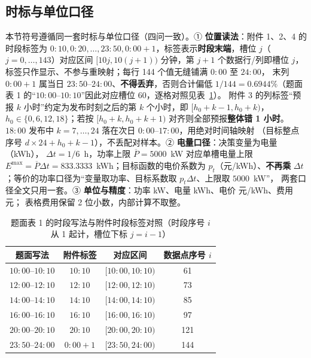 \subsection{时标与单位口径}\label{sec:data-ruler}

本节符号遵循同一套时标与单位口径（四问一致）。① \textbf{位置读法}：附件 1、2、4 的时段标签为 \(0{:}10,0{:}20,\dots,23{:}50,0{:}00{+}1\)，标签表示\textbf{时段末端}，槽位 \(j\)（\(j=0,\dots,143\)）对应区间 \([10j,10(j+1))\) 分钟，第 \(j+1\)
个数据行/列即槽位 \(j\)，标签只作显示、不参与重映射；每行 144 个值无缝铺满 \(0{:}00\) 至 \(24{:}00\)，
末列 \(0{:}00{+}1\) 属当日 \(23{:}50\)--\(24{:}00\)、\textbf{不得丢弃}，否则合计偏低
\(1/144=0.6944\%\)（题面表 1 的“\(10{:}00\)--\(10{:}10\)”因此对应槽位 60，逐格对照见表~\ref{tab:timeruler}）。
附件 3 的列标签“预报 \(k\) 小时”约定为发布时刻之后的第 \(k\) 个小时，即
\([h_0+k-1,h_0+k)\)，\(h_0\in\{0,6,12,18\}\)；若按 \([h_0+k,h_0+k+1)\) 对齐则全部预报\textbf{整体错
1 小时}。\(18{:}00\) 发布中 \(k=7,\dots,24\) 落在次日 \(0{:}00\)--\(17{:}00\)，用绝对时间轴映射
（目标整点序号 \(d\times24+h_0+k-1\)），不丢配对样本。② \textbf{电量口径}：决策变量为电量（kWh），
\(\Delta t=1/6\)~h，功率上限 \(\overline P=5000\)~kW 对应单槽电量上限
\(E^{\max}=\overline P\Delta t=833.3333\)~kWh；目标函数的电价系数为 \(p_t\)（元/kWh）、\textbf{不再乘}
\(\Delta t\)；等价的功率口径为“变量取功率、目标系数取 \(p_t\Delta t\)、上限取 \(5000\)~kW”，
两套口径全文只用一套。③ \textbf{单位与精度}：功率 kW、电量 kWh、电价 元/kWh、费用 元；
表格费用保留 2 位小数，内部计算不取整。

\begin{table}[htbp]
  \centering
  \caption{题面表 1 的时段写法与附件时段标签对照（时段序号 \(i\) 从 1 起计，槽位下标 \(j=i-1\)）}
  \label{tab:timeruler}
  \small
  \begin{tabular}{cccc}
    \toprule
    题面写法 & 附件标签 & 对应区间 & 数据点序号 \(i\) \\
    \midrule
    \(10{:}00\)--\(10{:}10\) & \(10{:}10\) & \([10{:}00,10{:}10)\) & 61 \\
    \(12{:}00\)--\(12{:}10\) & \(12{:}10\) & \([12{:}00,12{:}10)\) & 73 \\
    \(14{:}00\)--\(14{:}10\) & \(14{:}10\) & \([14{:}00,14{:}10)\) & 85 \\
    \(16{:}00\)--\(16{:}10\) & \(16{:}10\) & \([16{:}00,16{:}10)\) & 97 \\
    \(20{:}00\)--\(20{:}10\) & \(20{:}10\) & \([20{:}00,20{:}10)\) & 121 \\
    \(23{:}50\)--\(24{:}00\) & \(0{:}00{+}1\) & \([23{:}50,24{:}00)\) & 144 \\
    \bottomrule
  \end{tabular}
\end{table}

